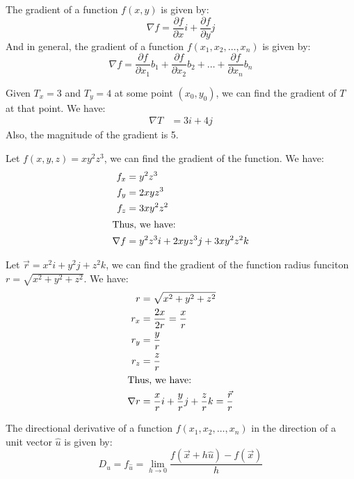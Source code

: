 \documentclass[11pt]{report}
\begin{document}
\begin{theorem}
    The gradient of a function $f(x, y)$ is given by:
    \begin{equation}
        \nabla f = \frac{\partial f}{\partial x}i + \frac{\partial f}{\partial y}j
    \end{equation}
    And in general, the gradient of a function $f(x_1, x_2, \dots, x_n)$ is given by:
    \begin{equation}
        \nabla f = \frac{\partial f}{\partial x_1}b_1 + \frac{\partial f}{\partial x_2}b_2 + \dots + \frac{\partial f}{\partial x_n}b_n
    \end{equation}
\end{theorem}
\begin{example}
    Given $T_x = 3$ and $T_y = 4$ at some point $(x_0, y_0)$, we can find the gradient of $T$ at that point. We have:
    \begin{align*}
        \nabla T &= 3i + 4j
    \end{align*}
    Also, the magnitude of the gradient is 5.
\end{example}
\begin{example}
    Let $f(x, y, z) = xy^2z^3$, we can find the gradient of the function. We have:
    \begin{align*}
        f_x &= y^2z^3 \\
        f_y &= 2xyz^3 \\
        f_z &= 3xy^2z^2 \\
        \intertext{Thus, we have:}
        \nabla f &= y^2z^3i + 2xyz^3j + 3xy^2z^2k
    \end{align*}
\end{example}
\begin{example}
    Let $\vec{r} = x^2i + y^2j + z^2k$, we can find the gradient of the function radius funciton $r = \sqrt{x^2 + y^2 + z^2}$. We have:
    \begin{align*}
        r &= \sqrt{x^2 + y^2 + z^2} \\
        r_x &= \frac{2x}{2r} = \frac{x}{r} \\
        r_y &= \frac{y}{r} \\
        r_z &= \frac{z}{r} \\
        \intertext{Thus, we have:}
        \nabla r &= \frac{x}{r}i + \frac{y}{r}j + \frac{z}{r}k = \frac{\vec{r}}{r}
    \end{align*}
\end{example}
\begin{definition}
    The directional derivative of a function $f(x_1, x_2, \dots, x_n)$ in the direction of a unit vector $\hat{u}$ is given by:
    \begin{equation}
        D_{\hat{u}} = f_{\hat{u}} = \lim_{h \to 0} \frac{f(\vec{x} + h\hat{u}) - f(\vec{x})}{h}
    \end{equation}
\end{definition}
\end{document}
